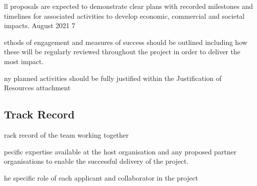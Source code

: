 \documentclass[a4paper,11point]{article}
\def\ii#1\par{{\color{blue!40}\sl #1}\par}
\def\iitem#1\par{\ii\begin{itemize}[nosep]\item #1 \end{itemize}\par}
\begin{document}
\iitem All proposals are expected to demonstrate clear plans with recorded 
milestones and timelines for associated activities to develop 
economic, commercial and societal impacts.  
August 2021 7 
 

\iitem Methods of engagement and measures of success should be outlined 
including how these will be regularly reviewed throughout the project 
in order to deliver the most impact. 

\iitem Any planned activities should be fully justified within the Justification 
of Resources attachment








\subsection{Track Record}
\ii{
The majority of the track record relevant to the project should be located 
within the Narrative CV and should not be repeated within the case for 
support. You may, however, want to describe: }

\iitem Track record of the team working together  

\iitem Specific expertise available at the host organisation and any 
proposed partner organisations to enable the successful delivery of 
the project.  

\iitem The specific role of each applicant and collaborator in the project
\end{document}
